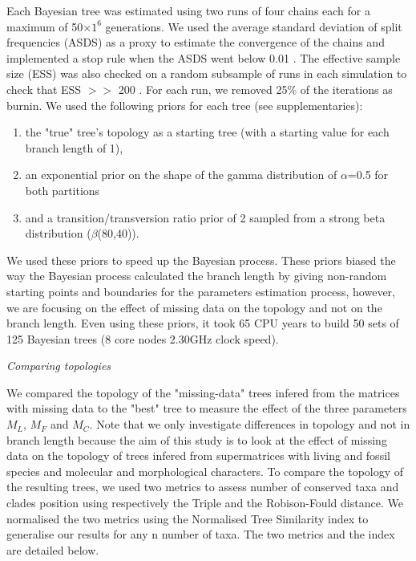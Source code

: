 \documentclass[12pt,letterpaper]{article}
\renewcommand{\subsection}[1]{%
\bigskip
\begin{center}
\begin{large}
\normalfont\itshape #1
\end{large}
\end{center}}
\begin{document}
Each Bayesian tree was estimated using two runs of four chains each for a maximum of 50$\times$$1^6$ generations. We used the average standard deviation of split frequencies (ASDS) as a proxy to estimate the convergence of the chains and implemented a stop rule when the ASDS went below 0.01 \citep{Ronquist2012mrbayes}. The effective sample size (ESS) was also checked on a random subsample of runs in each simulation to check that ESS $>>$ 200 \citep{drummond2006ess}. For each run, we removed 25\% of the iterations as burnin. We used the following priors for each tree (see supplementaries): %
\begin{enumerate}
\item
the "true" tree’s topology as a starting tree (with a starting value for each branch length of 1),
\item
an exponential prior on the shape of the gamma distribution of $\alpha$=0.5 for both partitions
\item
and a transition/transversion ratio prior of 2 sampled from a strong beta distribution ($\beta$(80,40)).
\end{enumerate}

We used these priors to speed up the Bayesian process. These priors biased the way the Bayesian process calculated the branch length by giving non-random starting points and boundaries for the parameters estimation process, however, we are focusing on the effect of missing data on the topology and not on the branch length. Even using these priors, it took 65 CPU years to build 50 sets of 125 Bayesian trees (8 core nodes 2.30GHz clock speed).

\subsection{Comparing topologies}
We compared the topology of the "missing-data" trees infered from the matrices with missing data to the "best" tree to measure the effect of the three parameters $M_{L}$, $M_{F}$ and $M_{C}$. Note that we only investigate differences in topology and not in branch length because the aim of this study is to look at the effect of missing data on the topology of trees infered from supermatrices with living and fossil species and molecular and morphological characters. To compare the topology of the resulting trees, we used two metrics to assess number of conserved taxa and clades position using respectively the Triple \citep{dobson1975triplets} and the Robison-Fould \citep{RF1981} distance. We normalised the two metrics using the Normalised Tree Similarity index \citep{Bogdanowicz2012} to generalise our results for any n number of taxa. The two metrics and the index are detailed below.
\end{document}

